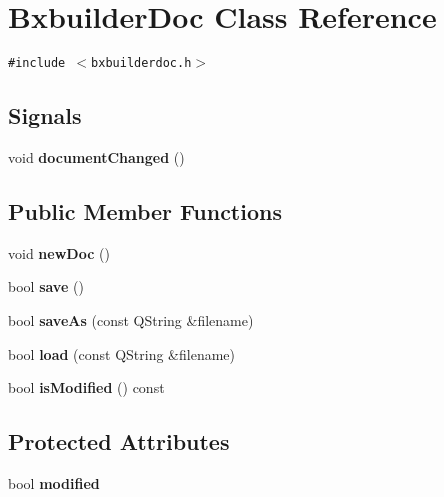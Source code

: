 \hypertarget{class_bxbuilder_doc}{
\section{BxbuilderDoc Class Reference}
\label{class_bxbuilder_doc}
}
{\tt \#include $<$bxbuilderdoc.h$>$}

\subsection*{Signals}
\begin{CompactItemize}
\item 
\hypertarget{class_bxbuilder_doc_a9774fead2165f1a34ead13457a339e1}{
void \textbf{documentChanged} ()}
\label{class_bxbuilder_doc_a9774fead2165f1a34ead13457a339e1}

\end{CompactItemize}
\subsection*{Public Member Functions}
\begin{CompactItemize}
\item 
\hypertarget{class_bxbuilder_doc_cd4d9e25cba12cd4774aa364e116b656}{
void \textbf{newDoc} ()}
\label{class_bxbuilder_doc_cd4d9e25cba12cd4774aa364e116b656}

\item 
\hypertarget{class_bxbuilder_doc_69458f4271dc75dfcceabe6c7b2776b8}{
bool \textbf{save} ()}
\label{class_bxbuilder_doc_69458f4271dc75dfcceabe6c7b2776b8}

\item 
\hypertarget{class_bxbuilder_doc_2ec972bcca1656b6d459f2f980929b57}{
bool \textbf{saveAs} (const QString \&filename)}
\label{class_bxbuilder_doc_2ec972bcca1656b6d459f2f980929b57}

\item 
\hypertarget{class_bxbuilder_doc_9f9671aad425992e3572f73844cac3a0}{
bool \textbf{load} (const QString \&filename)}
\label{class_bxbuilder_doc_9f9671aad425992e3572f73844cac3a0}

\item 
\hypertarget{class_bxbuilder_doc_5f692bfbe939574b6e89835e959a66ac}{
bool \textbf{isModified} () const }
\label{class_bxbuilder_doc_5f692bfbe939574b6e89835e959a66ac}

\end{CompactItemize}
\subsection*{Protected Attributes}
\begin{CompactItemize}
\item 
\hypertarget{class_bxbuilder_doc_48b46e9dd96a6a268ee4e28d52a3ed87}{
bool \textbf{modified}}
\label{class_bxbuilder_doc_48b46e9dd96a6a268ee4e28d52a3ed87}

\end{CompactItemize}


